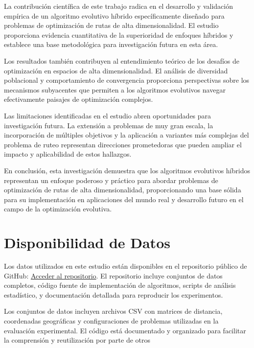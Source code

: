 \documentclass[10pt,a4paper]{article}
\begin{document}
La contribución científica de este trabajo radica en el desarrollo y validación empírica de un algoritmo evolutivo híbrido específicamente diseñado para problemas de optimización de rutas de alta dimensionalidad. El estudio proporciona evidencia cuantitativa de la superioridad de enfoques híbridos y establece una base metodológica para investigación futura en esta área.

Los resultados también contribuyen al entendimiento teórico de los desafíos de optimización en espacios de alta dimensionalidad. El análisis de diversidad poblacional y comportamiento de convergencia proporciona perspectivas sobre los mecanismos subyacentes que permiten a los algoritmos evolutivos navegar efectivamente paisajes de optimización complejos.

Las limitaciones identificadas en el estudio abren oportunidades para investigación futura. La extensión a problemas de muy gran escala, la incorporación de múltiples objetivos y la aplicación a variantes más complejas del problema de ruteo representan direcciones prometedoras que pueden ampliar el impacto y aplicabilidad de estos hallazgos.

En conclusión, esta investigación demuestra que los algoritmos evolutivos híbridos representan un enfoque poderoso y práctico para abordar problemas de optimización de rutas de alta dimensionalidad, proporcionando una base sólida para su implementación en aplicaciones del mundo real y desarrollo futuro en el campo de la optimización evolutiva.



\section{Disponibilidad de Datos}

Los datos utilizados en este estudio están disponibles en el repositorio público de GitHub: \href{https://github.com/YonhelMamaniCruz/M_optimizacion/tree/main/actividad3_unidad2}{Acceder al repositorio}. El repositorio incluye conjuntos de datos completos, código fuente de implementación de algoritmos, scripts de análisis estadístico, y documentación detallada para reproducir los experimentos.

Los conjuntos de datos incluyen archivos CSV con matrices de distancia, coordenadas geográficas y configuraciones de problemas utilizadas en la evaluación experimental. El código está documentado y organizado para facilitar la comprensión y reutilización por parte de otros
\end{document}
